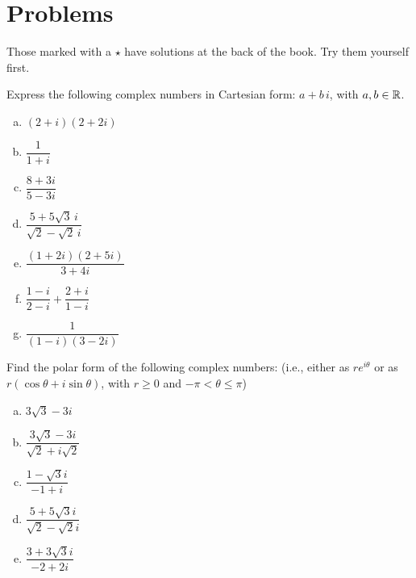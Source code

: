 \section*{Problems}
Those marked with a $\star$ have solutions at the back of the book. Try them yourself first.

\begin{prob}
\label{prob01.1}\sov

 Express the following complex numbers in  Cartesian form: $a + b \,i$, with $a, b \in \mathbb{R}$.
\medskip
\begin{enumerate}[a)]
\item    $(2+i)(2+2 i)$ \medskip  
\item $ \dfrac 1{1+i}$\medskip 
\item $  \dfrac{8+3i}{5-3i}$\medskip 
\item $\dfrac{5+5\sqrt{3}\,i}{\sqrt{2}-\sqrt{2}\,i}$\medskip 
\item $\dfrac{(1+2i)(2+5i)}{3+4i}$\medskip  

\item $\dfrac{1-i}{2-i}+\dfrac{2+i}{1-i}$\smallskip
% 
\item $\dfrac 1{(1-i)(3-2i)}$
%
\end{enumerate}

\end{prob}
\begin{prob}
\label{prob01.2}\sov  Find the polar form of the following complex numbers: (i.e., either  as $r e^{i\theta}$ or as $r(\cos \theta + i \sin \theta)$, with $r\geq 0$ and $-\pi <\theta \leq \pi$)\medskip
\begin{enumerate}[a)]

\item ${3\sqrt{3}-3i}$\medskip
\item $\dfrac{3\sqrt{3}-3i} {\sqrt{2}+i\sqrt{2}}$\medskip

\item $\dfrac{1-\sqrt{3}i}{-1+i}$ \medskip
\item $\dfrac{5+5\sqrt{3}i}{\sqrt{2}-\sqrt{2}i}$ \medskip
\item $\dfrac{3+3\sqrt{3}i} {-2+2i}$ \medskip
\end{enumerate}

\end{prob}
